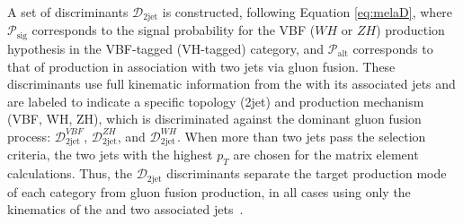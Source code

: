 
 
A set of discriminants $\mathcal{D}_\text{2jet}$ is constructed, following Equation \ref{eq:melaD},
where $\mathcal{P}_\text{sig}$ corresponds to the signal probability for the VBF ($WH$ or $ZH$)
production hypothesis in the VBF-tagged (VH-tagged) category, and $\mathcal{P}_\mathrm{alt}$
corresponds to that of \Hboson production in association with two jets via gluon fusion.
These discriminants use full kinematic information from the \Hboson with its associated jets and 
are labeled to indicate a specific topology (2jet) and production mechanism (VBF, WH, ZH), 
which is discriminated against the dominant gluon fusion process:
$\mathcal{D}_\mathrm{2jet}^{VBF}$, 
$\mathcal{D}_\mathrm{2jet}^{ZH}$,
and $\mathcal{D}_\mathrm{2jet}^{WH}$.
When more than two jets pass the selection criteria, the two jets with the highest $p_T$ are chosen 
for the matrix element calculations. Thus, the $\mathcal{D}_\text{2jet}$ discriminants separate the 
target production mode of each category from gluon fusion production,
in all cases using only the kinematics of the \Hboson and two associated jets~\cite{PhysRevD.111.092014}.

    
    
